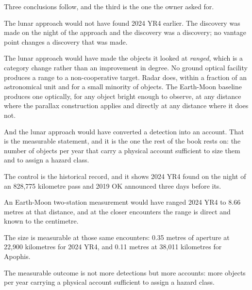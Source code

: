 Three conclusions follow, and the third is the one the owner asked for.

The lunar approach would not have found 2024 YR4 earlier. The discovery was
made on the night of the approach and the discovery was a discovery; no
vantage point changes a discovery that was made.

The lunar approach would have made the objects it looked at \emph{ranged},
which is a category change rather than an improvement in degree. No ground
optical facility produces a range to a non-cooperative target. Radar does,
within a fraction of an astronomical unit and for a small minority of
objects. The Earth-Moon baseline produces one optically, for any object
bright enough to observe, at any distance where the parallax construction
applies and directly at any distance where it does not.

And the lunar approach would have converted a detection into an account.
That is the measurable statement, and it is the one the rest of the book
rests on: the number of objects per year that carry a physical account
sufficient to size them and to assign a hazard class.

\begin{keytakeaways}
\item The control is the historical record, and it shows 2024 YR4 found on
the night of an 828,775 kilometre pass and 2019 OK announced three days
before its.
\item An Earth-Moon two-station measurement would have ranged 2024 YR4 to
8.66 metres at that distance, and at the closer encounters the range is
direct and known to the centimetre.
\item The size is measurable at those same encounters: 0.35 metres of
aperture at 22,900 kilometres for 2024 YR4, and 0.11 metres at 38,011
kilometres for Apophis.
\item The measurable outcome is not more detections but more accounts: more
objects per year carrying a physical account sufficient to assign a hazard
class.
\end{keytakeaways}
